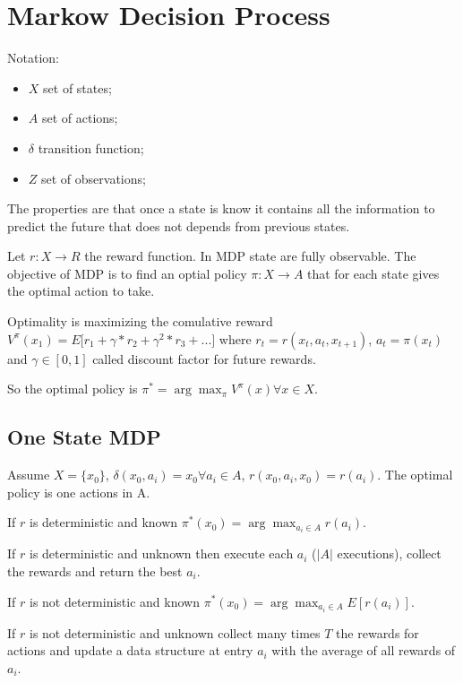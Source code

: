 \section{Markow Decision Process}

Notation:
\begin{itemize}
    \item $X$ set of states;
    \item $A$ set of actions;
    \item $\delta$ transition function;
    \item $Z$ set of observations;
\end{itemize}

The properties are that once a state is know it contains all the information to predict the future that does not depends from previous states.

Let $r: X \rightarrow R$ the reward function. In MDP state are fully observable. The objective of MDP is to find an optial policy $\pi: X \rightarrow A$ that for each state gives the optimal action to take.

Optimality is maximizing the comulative reward $V^\pi(x_1) = E\big[r_1+\gamma*r_2+\gamma^2*r_3 + ...\big]$ where $r_t = r(x_t, a_t, x_{t+1})$, $a_t = \pi(x_t)$ and $\gamma \in [0,1]$ called discount factor for future rewards.

So the optimal policy is $\pi^* = \arg\max_\pi V^\pi(x) \forall x \in X$.

\subsection{One State MDP}

Assume $X = \{x_0\}$, $\delta(x_0, a_i) = x_0 \forall a_i \in A$, $r(x_0, a_i, x_0) = r(a_i)$. The optimal policy is one actions in A.

If $r$ is deterministic and known $\pi^*(x_0) = \arg\max_{a_i \in A} r(a_i)$.

If $r$ is deterministic and unknown then execute each $a_i$ ($|A|$ executions), collect the rewards and return the best $a_i$.

If $r$ is not deterministic and known $\pi^*(x_0) = \arg\max_{a_i \in A} E[r(a_i)]$.

If $r$ is not deterministic and unknown collect many times $T$ the rewards for actions and update a data structure at entry $a_i$ with the average of all rewards of $a_i$.




